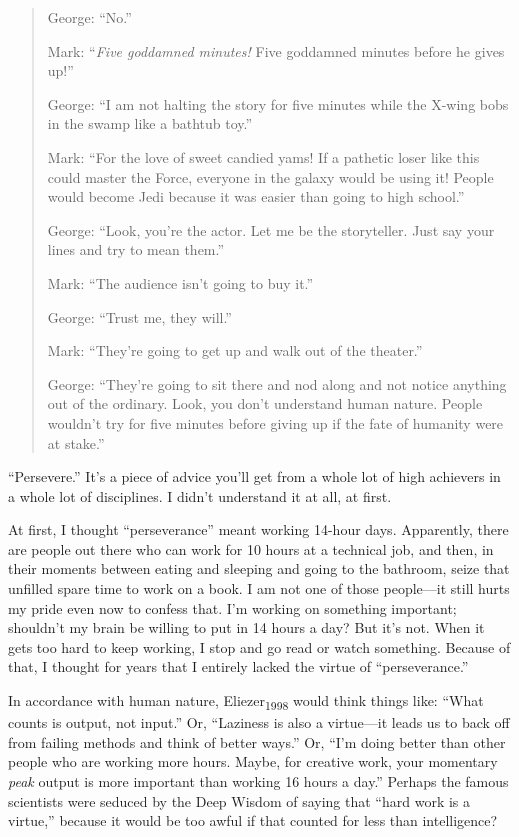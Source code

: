 \begin{quotation}
{
 George: ``No.''}

{
 Mark: ``\textit{Five goddamned minutes!} Five
goddamned minutes before he gives up!''}

{
 George: ``I am not halting the story for five
minutes while the X-wing bobs in the swamp like a bathtub
toy.''}

{
 Mark: ``For the love of sweet candied yams! If a
pathetic loser like this could master the Force, everyone in the galaxy
would be using it! People would become Jedi because it was easier than
going to high school.''}

{
 George: ``Look, you're the actor.
Let me be the storyteller. Just say your lines and try to mean
them.''}

{
 Mark: ``The audience isn't going
to buy it.''}

{
 George: ``Trust me, they
will.''}

{
 Mark: ``They're going to get up
and walk out of the theater.''}

{
 George: ``They're going to sit
there and nod along and not notice anything out of the ordinary. Look,
you don't understand human nature. People
wouldn't try for five minutes before giving up if the
fate of humanity were at stake.''}
\end{quotation}

\myendsectiontext


{
 ``Persevere.''
It's a piece of advice you'll get from
a whole lot of high achievers in a whole lot of disciplines. I
didn't understand it at all, at first. }

{
 At first, I thought
``perseverance'' meant working
14-hour days. Apparently, there are people out there who can work for
10 hours at a technical job, and then, in their moments between eating
and sleeping and going to the bathroom, seize that unfilled spare time
to work on a book. I am not one of those people---it still hurts my
pride even now to confess that. I'm working on
something important; shouldn't my brain be willing to
put in 14 hours a day? But it's not. When it gets too
hard to keep working, I stop and go read or watch something. Because of
that, I thought for years that I entirely lacked the virtue of
``perseverance.''}

{
 In accordance with human nature, Eliezer\textsubscript{1998} would
think things like: ``What counts is output, not
input.'' Or, ``Laziness is also a
virtue---it leads us to back off from failing methods and think of
better ways.'' Or,
``I'm doing better than other people
who are working more hours. Maybe, for creative work, your momentary
\textit{peak} output is more important than working 16 hours a
day.'' Perhaps the famous scientists were seduced by
the Deep Wisdom of saying that ``hard work is a
virtue,'' because it would be too awful if that
counted for less than intelligence?}


